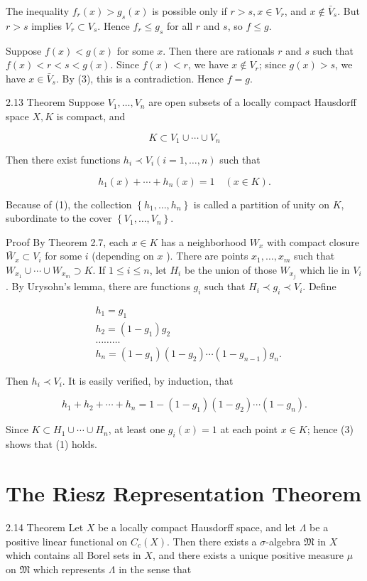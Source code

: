 \documentclass[10pt]{article}
\begin{document}
The inequality $f_{r}(x)>g_{s}(x)$ is possible only if $r>s, x \in V_{r}$, and $x \notin \bar{V}_{s}$. But $r>s$ implies $V_{r} \subset V_{s}$. Hence $f_{r} \leq g_{s}$ for all $r$ and $s$, so $f \leq g$.

Suppose $f(x)<g(x)$ for some $x$. Then there are rationals $r$ and $s$ such that $f(x)<r<s<g(x)$. Since $f(x)<r$, we have $x \notin V_{r}$; since $g(x)>s$, we have $x \in \bar{V}_{s}$. By (3), this is a contradiction. Hence $f=g$.

2.13 Theorem Suppose $V_{1}, \ldots, V_{n}$ are open subsets of a locally compact Hausdorff space $X, K$ is compact, and

$$
K \subset V_{1} \cup \cdots \cup V_{n}
$$

Then there exist functions $h_{i} \prec V_{i}(i=1, \ldots, n)$ such that

$$
h_{1}(x)+\cdots+h_{n}(x)=1 \quad(x \in K) .
$$

Because of (1), the collection $\left\{h_{1}, \ldots, h_{n}\right\}$ is called a partition of unity on $K$, subordinate to the cover $\left\{V_{1}, \ldots, V_{n}\right\}$.

Proof By Theorem 2.7, each $x \in K$ has a neighborhood $W_{x}$ with compact closure $\bar{W}_{x} \subset V_{i}$ for some $i$ (depending on $x$ ). There are points $x_{1}, \ldots, x_{m}$ such that $W_{x_{1}} \cup \cdots \cup W_{x_{m}} \supset K$. If $1 \leq i \leq n$, let $H_{i}$ be the union of those $W_{x_{j}}$ which lie in $V_{i}$. By Urysohn's lemma, there are functions $g_{i}$ such that $H_{i} \prec g_{i} \prec V_{i}$. Define

$$
\begin{aligned}
& h_{1}=g_{1} \\
& h_{2}=\left(1-g_{1}\right) g_{2} \\
& \ldots \ldots \ldots \\
& h_{n}=\left(1-g_{1}\right)\left(1-g_{2}\right) \cdots\left(1-g_{n-1}\right) g_{n} .
\end{aligned}
$$

Then $h_{i} \prec V_{i}$. It is easily verified, by induction, that

$$
h_{1}+h_{2}+\cdots+h_{n}=1-\left(1-g_{1}\right)\left(1-g_{2}\right) \cdots\left(1-g_{n}\right) .
$$

Since $K \subset H_{1} \cup \cdots \cup H_{n}$, at least one $g_{i}(x)=1$ at each point $x \in K$; hence (3) shows that (1) holds.

\section{The Riesz Representation Theorem}
2.14 Theorem Let $X$ be a locally compact Hausdorff space, and let $\Lambda$ be a positive linear functional on $C_{c}(X)$. Then there exists a $\sigma$-algebra $\mathfrak{M}$ in $X$ which contains all Borel sets in $X$, and there exists a unique positive measure $\mu$ on $\mathfrak{M}$ which represents $\Lambda$ in the sense that
\end{document}
